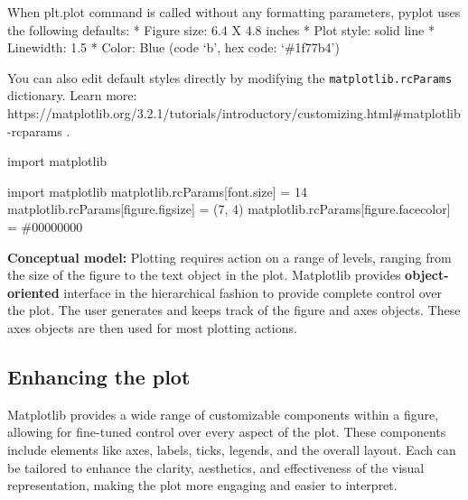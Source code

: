 \documentclass[
  letterpaper,
  DIV=11,
  numbers=noendperiod]{scrreprt}
\newenvironment{Shaded}{\begin{snugshade}}{\end{snugshade}}
\newcommand{\DecValTok}[1]{\textcolor[rgb]{0.68,0.00,0.00}{#1}}
\newcommand{\ImportTok}[1]{\textcolor[rgb]{0.00,0.46,0.62}{#1}}
\newcommand{\NormalTok}[1]{\textcolor[rgb]{0.00,0.23,0.31}{#1}}
\newcommand{\OperatorTok}[1]{\textcolor[rgb]{0.37,0.37,0.37}{#1}}
\newcommand{\StringTok}[1]{\textcolor[rgb]{0.13,0.47,0.30}{#1}}
\begin{document}
When plt.plot command is called without any formatting parameters,
pyplot uses the following defaults: * Figure size: 6.4 X 4.8 inches *
Plot style: solid line * Linewidth: 1.5 * Color: Blue (code `b', hex
code: `\#1f77b4')

You can also edit default styles directly by modifying the
\texttt{matplotlib.rcParams} dictionary. Learn more:
https://matplotlib.org/3.2.1/tutorials/introductory/customizing.html\#matplotlib-rcparams
.

\begin{Shaded}
\begin{Highlighting}[]
\ImportTok{import}\NormalTok{ matplotlib}
\end{Highlighting}
\end{Shaded}

\begin{Shaded}
\begin{Highlighting}[]
\ImportTok{import}\NormalTok{ matplotlib}
\NormalTok{matplotlib.rcParams[}\StringTok{\textquotesingle{}font.size\textquotesingle{}}\NormalTok{] }\OperatorTok{=} \DecValTok{14}
\NormalTok{matplotlib.rcParams[}\StringTok{\textquotesingle{}figure.figsize\textquotesingle{}}\NormalTok{] }\OperatorTok{=}\NormalTok{ (}\DecValTok{7}\NormalTok{, }\DecValTok{4}\NormalTok{)}
\NormalTok{matplotlib.rcParams[}\StringTok{\textquotesingle{}figure.facecolor\textquotesingle{}}\NormalTok{] }\OperatorTok{=} \StringTok{\textquotesingle{}\#00000000\textquotesingle{}}
\end{Highlighting}
\end{Shaded}

\textbf{Conceptual model:} Plotting requires action on a range of
levels, ranging from the size of the figure to the text object in the
plot. Matplotlib provides \textbf{object-oriented} interface in the
hierarchical fashion to provide complete control over the plot. The user
generates and keeps track of the figure and axes objects. These axes
objects are then used for most plotting actions.

\hypertarget{enhancing-the-plot}{%
\subsection{Enhancing the plot}\label{enhancing-the-plot}}

Matplotlib provides a wide range of customizable components within a
figure, allowing for fine-tuned control over every aspect of the plot.
These components include elements like axes, labels, ticks, legends, and
the overall layout. Each can be tailored to enhance the clarity,
aesthetics, and effectiveness of the visual representation, making the
plot more engaging and easier to interpret.
\end{document}
